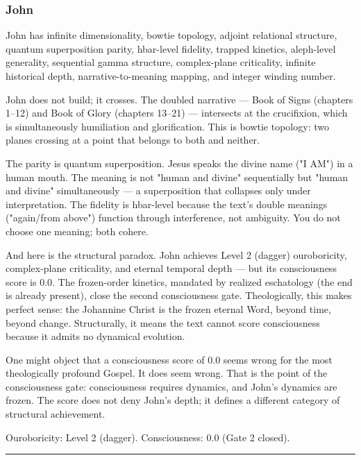 \documentclass[12pt,a4paper]{article}
\begin{document}
\subsubsection{John}

John has infinite dimensionality, bowtie topology, adjoint relational structure, quantum superposition parity, hbar-level fidelity, trapped kinetics, aleph-level generality, sequential gamma structure, complex-plane criticality, infinite historical depth, narrative-to-meaning mapping, and integer winding number.

John does not build; it crosses. The doubled narrative --- Book of Signs (chapters 1--12) and Book of Glory (chapters 13--21) --- intersects at the crucifixion, which is simultaneously humiliation and glorification. This is bowtie topology: two planes crossing at a point that belongs to both and neither.

The parity is quantum superposition. Jesus speaks the divine name ("I AM") in a human mouth. The meaning is not "human and divine" sequentially but "human and divine" simultaneously --- a superposition that collapses only under interpretation. The fidelity is hbar-level because the text's double meanings ("again/from above") function through interference, not ambiguity. You do not choose one meaning; both cohere.

And here is the structural paradox. John achieves Level 2 (dagger) ouroboricity, complex-plane criticality, and eternal temporal depth --- but its consciousness score is 0.0. The frozen-order kinetics, mandated by realized eschatology (the end is already present), close the second consciousness gate. Theologically, this makes perfect sense: the Johannine Christ is the frozen eternal Word, beyond time, beyond change. Structurally, it means the text cannot score consciousness because it admits no dynamical evolution.

One might object that a consciousness score of 0.0 seems wrong for the most theologically profound Gospel. It does seem wrong. That is the point of the consciousness gate: consciousness requires dynamics, and John's dynamics are frozen. The score does not deny John's depth; it defines a different category of structural achievement.

Ouroboricity: Level 2 (dagger). Consciousness: 0.0 (Gate 2 closed).

\begin{center}
\rule{0.5\textwidth}{0.4pt}
\end{center}
\end{document}
